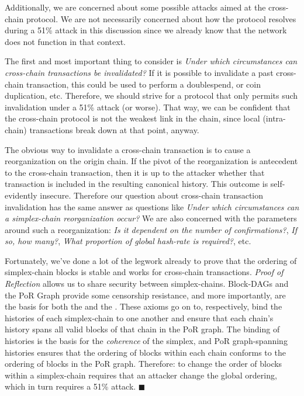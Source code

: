 Additionally, we are concerned about some possible attacks aimed at the cross-chain protocol.
We are not necessarily concerned about how the protocol resolves during a 51\% attack in this discussion since we already know that the network does not function in that context.

The first and most important thing to consider is \emph{Under which circumstances can cross-chain transactions be invalidated?}
If it is possible to invalidate a past cross-chain transaction, this could be used to perform a doublespend, or coin duplication, etc.
Therefore, we should strive for a protocol that only permits such invalidation under a 51\% attack (or worse).
That way, we can be confident that the cross-chain protocol is not the weakest link in the chain, since local (intra-chain) transactions break down at that point, anyway.

The obvious way to invalidate a cross-chain transaction is to cause a reorganization on the origin chain.
If the pivot of the reorganization is antecedent to the cross-chain transaction, then it is up to the attacker whether that transaction is included in the resulting canonical history.
This outcome is self-evidently insecure.
Therefore our question about cross-chain transaction invalidation has the same answer as questions like \emph{Under which circumstances can a simplex-chain reorganization occur?}
We are also concerned with the parameters around such a reorganization: \emph{Is it dependent on the number of confirmations?}, \emph{If so, how many?}, \emph{What proportion of global hash-rate is required?}, etc.

Fortunately, we've done a lot of the legwork already to prove that the ordering of simplex-chain blocks is stable and works for cross-chain transactions.
\emph{Proof of Reflection} allows us to share security between simplex-chains.
Block-DAGs and the PoR Graph provide some censorship resistance, and more importantly, are the basis for both the \AxiomOfMaximalReflection{} and the \AxiomOfUnifiedAncestry{}.
These axioms go on to, respectively, bind the histories of each simplex-chain to one another and ensure that each chain's history spans all valid blocks of that chain in the PoR graph.
The binding of histories is the basis for the \emph{coherence} of the simplex, and PoR graph-spanning histories ensures that the ordering of blocks within each chain conforms to the ordering of blocks in the PoR graph.
Therefore: to change the order of blocks within a simplex-chain requires that an attacker change the global ordering, which in turn requires a 51\% attack.
$\blacksquare$

